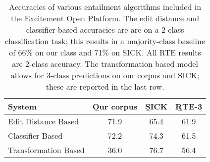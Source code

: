 %

%
%

\begin{table}
\begin{center}
\def\t#1{\small{#1}}
\begin{tabular}{l@{\hskip \colspaceL}c@{\hskip \colspaceL}c@{\hskip \colspaceL}c}
\toprule
\textbf{System} & \b{Our corpus} & \b{SICK} & \b{RTE-3} \\
\midrule
\t{Edit Distance Based}  & \t{71.9} & \t{65.4} & \t{61.9} \\
\t{Classifier Based}     & \t{72.2} & \t{74.3} & \t{61.5} \\
\midrule
\t{Transformation Based} & \t{36.0} & \t{76.7} & \t{56.4} \\
\bottomrule
\end{tabular}
\end{center}
\caption{
\label{tab:eopresults}
Accuracies of various entailment algorithms included in the
  Excitement Open Platform.
The edit distance and classifier based accuracies are are on a 2-class
  classification task; this results in a majority-class baseline
  of 66\% on our class and 71\% on SICK.
All RTE results are 2-class accuracy.
The transformation based model allows for 3-class predictions on our
  corpus and SICK; these are reported in the last row.
}
\end{table}
%
%

